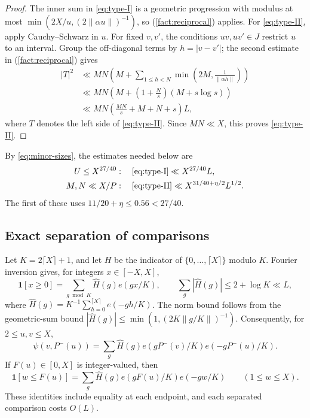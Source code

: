 \documentclass{amsart}
\newcounter{fact}
\numberwithin{equation}{section}
\numberwithin{table}{section}
\newcommand{\ind}{\mathbf 1}
\begin{document}
\begin{proof}
The inner sum in \eqref{eq:type-I} is a geometric progression with
modulus at most $\min(2X/u,(2\|\alpha u\|)^{-1})$, so
(\ref{fact:reciprocal}) applies.
For \eqref{eq:type-II}, apply Cauchy--Schwarz in $u$. For fixed $v,v'$,
the conditions $uv,uv'\in J$ restrict $u$ to an interval.
Group the off-diagonal terms by $h=|v-v'|$; the second estimate in
(\ref{fact:reciprocal}) gives
\begin{align*}
|T|^2
&\ll MN\left(M+\sum_{1\le h<N}
\min\left(2M,\frac1{\|\alpha h\|}\right)\right)\\
&\ll MN\left(M+\left(1+\frac Ns\right)(M+s\log s)\right)\\
&\ll MN\left(\frac{MN}s+M+N+s\right)L,
\end{align*}
where $T$ denotes the left side of \eqref{eq:type-II}.
Since $MN\ll X$, this proves \eqref{eq:type-II}.
\end{proof}

By \eqref{eq:minor-sizes}, the estimates needed below are
\begin{align}
U\le X^{27/40}&:\quad \text{\eqref{eq:type-I}}\ll X^{27/40}L,
\label{eq:type-I-size}\\
M,N\ll X/P&:\quad \text{\eqref{eq:type-II}}
\ll X^{31/40+\eta/2}L^{1/2}.
\label{eq:type-II-size}
\end{align}
The first of these uses $11/20+\eta\le0.56<27/40$.

\subsection{Exact separation of comparisons}

Let $K=2\lceil X\rceil+1$, and let $H$ be the indicator of
$\{0,\ldots,\lceil X\rceil\}$ modulo $K$.
Fourier inversion gives, for integers $x\in[-X,X]$,
\begin{equation}\label{eq:Fourier-comparison}
\ind[x\ge0]=\sum_{g\bmod K}\widehat H(g)e(gx/K),
\qquad \sum_g|\widehat H(g)|\le2+\log K\ll L,
\end{equation}
where $\widehat H(g)=K^{-1}\sum_{h=0}^{\lceil X\rceil}e(-gh/K)$.
The norm bound follows from the geometric-sum bound
$|\widehat H(g)|\le\min(1,(2K\|g/K\|)^{-1})$.
Consequently, for $2\le u,v\le X$,
\begin{equation}\label{eq:separate-roughness}
\psi(v,P^-(u))
=\sum_g\widehat H(g)e(gP^-(v)/K)e(-gP^-(u)/K).
\end{equation}
If $F(u)\in[0,X]$ is integer-valued, then
\begin{equation}\label{eq:separate-cutoff}
\ind[w\le F(u)]
=\sum_g\widehat H(g)e(gF(u)/K)e(-gw/K)
\qquad(1\le w\le X).
\end{equation}
These identities include equality at each endpoint, and each separated
comparison costs $O(L)$.
\end{document}
